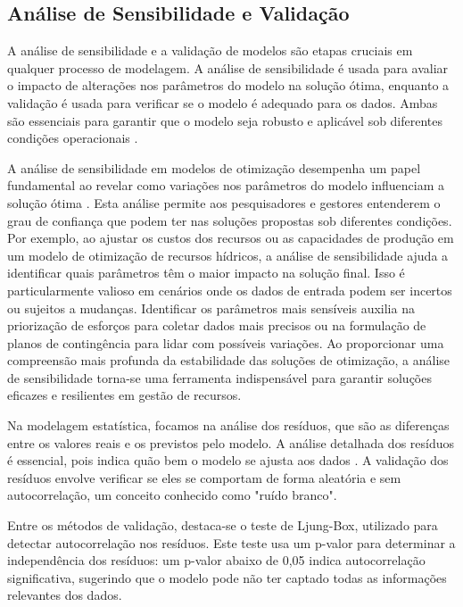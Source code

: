 \subsection{Análise de Sensibilidade e Validação} 
A análise de sensibilidade e a validação de modelos são etapas cruciais em qualquer processo de modelagem. A análise de sensibilidade é usada para avaliar o impacto de alterações nos parâmetros do modelo na solução ótima, enquanto a validação é usada para verificar se o modelo é adequado para os dados. Ambas são essenciais para garantir que o modelo seja robusto e aplicável sob diferentes condições operacionais \cite{SALTELLI201929}.

A análise de sensibilidade em modelos de otimização desempenha um papel fundamental ao revelar como variações nos parâmetros do modelo influenciam a solução ótima \cite{CASTILLO20081788}. Esta análise permite aos pesquisadores e gestores entenderem o grau de confiança que podem ter nas soluções propostas sob diferentes condições. Por exemplo, ao ajustar os custos dos recursos ou as capacidades de produção em um modelo de otimização de recursos hídricos, a análise de sensibilidade ajuda a identificar quais parâmetros têm o maior impacto na solução final. Isso é particularmente valioso em cenários onde os dados de entrada podem ser incertos ou sujeitos a mudanças. Identificar os parâmetros mais sensíveis auxilia na priorização de esforços para coletar dados mais precisos ou na formulação de planos de contingência para lidar com possíveis variações. Ao proporcionar uma compreensão mais profunda da estabilidade das soluções de otimização, a análise de sensibilidade torna-se uma ferramenta indispensável para garantir soluções eficazes e resilientes em gestão de recursos.

Na modelagem estatística, focamos na análise dos resíduos, que são as diferenças entre os valores reais e os previstos pelo modelo. A análise detalhada dos resíduos é essencial, pois indica quão bem o modelo se ajusta aos dados \cite{draper1998applied}. A validação dos resíduos envolve verificar se eles se comportam de forma aleatória e sem autocorrelação, um conceito conhecido como "ruído branco".

Entre os métodos de validação, destaca-se o teste de Ljung-Box, utilizado para detectar autocorrelação nos resíduos. Este teste usa um p-valor para determinar a independência dos resíduos: um p-valor abaixo de 0,05 indica autocorrelação significativa, sugerindo que o modelo pode não ter captado todas as informações relevantes dos dados.

